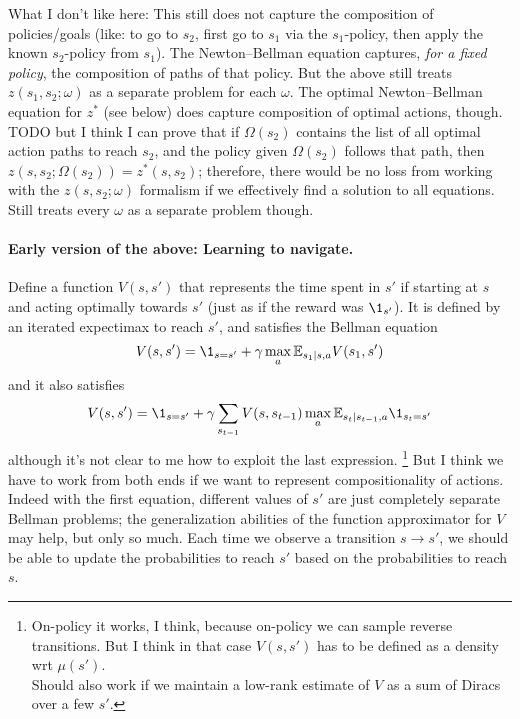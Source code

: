 \documentclass[11pt,a4paper]{article}
\begin{document}
What I don't like here: This still does not capture the composition of
policies/goals (like: to go to $s_2$, first go to $s_1$ via the
$s_1$-policy, then apply the known $s_2$-policy from $s_1$). The
Newton--Bellman equation captures, \emph{for a fixed policy}, the
composition of paths of that policy. But the above still treats
$z(s_1,s_2;\omega)$ as a separate problem for each $\omega$. The optimal
Newton--Bellman equation for $z^\ast$ (see below) does capture
composition of optimal actions, though. TODO but I think I can prove that
if $\Omega(s_2)$ contains the list of all optimal action paths to reach
$s_2$, and the policy given $\Omega(s_2)$ follows that path, then
$z(s,s_2;\Omega(s_2))=z^\ast(s,s_2)$; therefore, there would be no loss
from working with the $z(s,s_2;\omega)$ formalism if we effectively find
a solution to all equations. Still treats every $\omega$ as a separate
problem though.

\paragraph{Early version of the above: Learning to navigate.} Define a function $V(s,s')$ that
represents the time spent in $s'$ if starting at $s$ and acting optimally
towards $s'$ (just as if the reward was $\1_{s'}$). It is defined by an iterated expectimax to reach $s'$, and
satisfies the Bellman equation
\begin{equation}
\label{eq:optleftbellman}
V(s,s')=\1_{s=s'}+\gamma \max_a \E_{s_1|s,a} V(s_1,s')
\end{equation}
and it also satisfies
\begin{equation}
\label{eq:optrightbellman}
V(s,s')=\1_{s=s'}+\gamma \sum_{s_{t-1}} V(s,s_{t-1})\max_a
\E_{s_t|s_{t-1},a}\1_{s_t=s'}
\end{equation}
although it's not clear to me how to exploit the last expression. 
\footnote{On-policy it works, I think, because on-policy we can sample
reverse transitions. But I think in that case $V(s,s')$ has to be defined
as a density wrt $\mu(s')$.\\Should also work if we maintain a low-rank
estimate of $V$ as a sum of Diracs over a few $s'$.}
But I
think we have to work from both ends if we want to represent
compositionality of actions. Indeed with the first equation, different values
of $s'$ are just completely separate Bellman problems; the generalization
abilities of the function approximator for $V$ may help, but only so
much. Each time we observe a transition $s\to s'$, we should be able to
update the probabilities to reach $s'$ based on the probabilities to
reach $s$.
\end{document}
